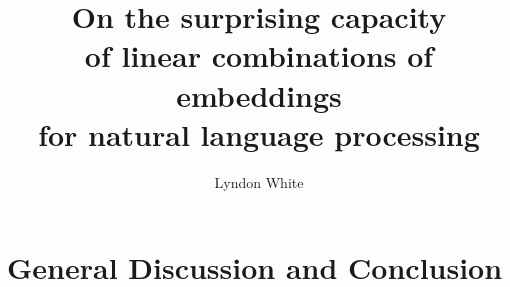 \documentclass{book}
\title{\Huge \sffamily On the surprising capacity\\ of linear combinations of embeddings\\ for natural language processing}
\author{Lyndon White}
\begin{document}
\maketitle



\tableofcontents





\part{General Discussion and Conclusion}



\end{document}
